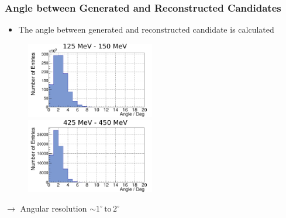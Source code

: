 \documentclass[slidestop,compress,mathserif]{beamer}
\begin{document}
\begin{frame}
	\frametitle{Angle between Generated and Reconstructed Candidates }

\begin{itemize}

	\item The angle between generated and reconstructed candidate is calculated
\end{itemize}

\begin{figure}
	\includegraphics[width=0.5\textwidth]{Pictures/20172604AngleRegGen100-125MeV}
	\includegraphics[width=0.5\textwidth]{Pictures/20172604AngleRegGen400-425MeV}

\end{figure}
$\rightarrow$ Angular resolution $\sim 1^{\circ} \,\text{to}\,2^{\circ}$



\end{frame}
\end{document}
